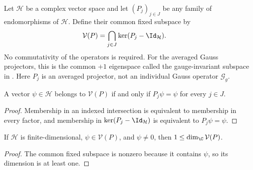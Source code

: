 \begin{definition}
    \label{def:mpug_common_fixed_subspace}
    \leanok
    Let $\mathcal H$ be a complex vector space and let $(P_j)_{j\in J}$ be any
    family of endomorphisms of $\mathcal H$. Define
    their common fixed subspace by
    \begin{align}
        \mathcal V(P)
         & =\bigcap_{j\in J}\ker(P_j-\Id_{\mathcal H}).
    \end{align}
    No commutativity of the operators is required. For the averaged Gauss
    projectors, this is the common $+1$ eigenspace called the gauge-invariant
    subspace in
    \cite[lines~4327--4335 and line~5198]{FrancoRubio2025MPUGauging}.
    Here $P_j$ is an averaged projector, not an individual Gauss operator
    $\mathcal G_g$.
\end{definition}

\begin{lemma}
    \label{thm:mpug_mem_common_fixed_subspace}
    \leanok
    A vector $\psi\in\mathcal H$ belongs to $\mathcal V(P)$ if and only if
    $P_j\psi=\psi$ for every $j\in J$.
\end{lemma}

\begin{proof}\leanok
    Membership in an indexed intersection is equivalent to membership in
    every factor, and membership in $\ker(P_j-\Id_{\mathcal H})$ is equivalent
    to $P_j\psi=\psi$.
\end{proof}

\begin{lemma}
    \label{thm:mpug_common_fixed_subspace_finrank}
    \leanok
    If $\mathcal H$ is finite-dimensional, $\psi\in\mathcal V(P)$, and
    $\psi\neq0$, then $1\leq\dim_{\C}\mathcal V(P)$.
\end{lemma}

\begin{proof}\leanok
    The common fixed subspace is nonzero because it contains $\psi$, so its
    dimension is at least one.
\end{proof}

